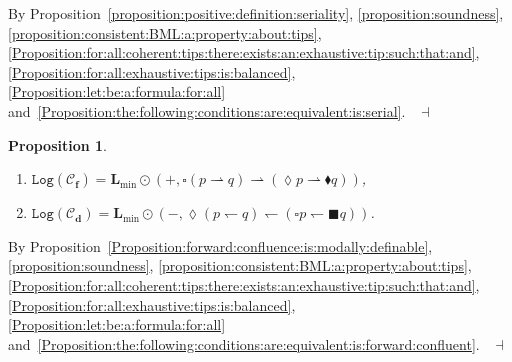 \documentclass[draft]{article}
\newtheorem{proposition}{Proposition}
\newenvironment{proof}{{\bf Proof:}}{~$\dashv$\\}
\def\fcfra{\mathbf{f}}
\def\dcfra{\mathbf{d}}
\def\Log{\mathtt{Log}}
\def\L{\mathbf{L}}
\begin{document}
%
%
\begin{proof}
%
%
By Proposition~\ref{proposition:positive:definition:seriality}, \ref{proposition:soundness}, \ref{proposition:consistent:BML:a:property:about:tips}, \ref{Proposition:for:all:coherent:tips:there:exists:an:exhaustive:tip:such:that:and}, \ref{Proposition:for:all:exhaustive:tips:is:balanced}, \ref{Proposition:let:be:a:formula:for:all} and~\ref{Proposition:the:following:conditions:are:equivalent:is:serial}.
%
%
\medskip
%
%
\end{proof}
%
%
\begin{proposition}\label{completeness:forward:conf}
%
%
\begin{enumerate}
%
%
\item $\Log({\mathcal C}_{\fcfra}){=}\L_{\min}{\odot}(+,{\square}(p{\rightharpoonup}q){\rightharpoonup}({\lozenge}p{\rightharpoonup}{\blacklozenge}q))$,
%
%
\item $\Log({\mathcal C}_{\dcfra}){=}\L_{\min}{\odot}(-,{\lozenge}(p{\leftharpoondown}q){\leftharpoondown}({\square}p{\leftharpoondown}{\blacksquare}q))$.
%
%
\end{enumerate}
%
%
\end{proposition}
%
%
\begin{proof}
%
%
By Proposition~\ref{Proposition:forward:confluence:is:modally:definable}, \ref{proposition:soundness}, \ref{proposition:consistent:BML:a:property:about:tips}, \ref{Proposition:for:all:coherent:tips:there:exists:an:exhaustive:tip:such:that:and}, \ref{Proposition:for:all:exhaustive:tips:is:balanced}, \ref{Proposition:let:be:a:formula:for:all} and~\ref{Proposition:the:following:conditions:are:equivalent:is:forward:confluent}.
%
%
\medskip
%
%
\end{proof}
%
%
%
%
%
%
%
%
%
%
%
%
%
%
%
%
\end{document}
